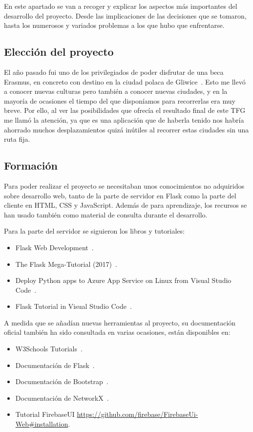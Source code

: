 
En este apartado se van a recoger y explicar los aspectos más importantes del desarrollo del proyecto. Desde las implicaciones de las decisiones que se tomaron, hasta los numerosos y variados problemas a los que hubo que enfrentarse.

\subsection{Elección del proyecto}

El año pasado fui uno de los privilegiados de poder disfrutar de una beca Erasmus, en concreto con destino en la ciudad polaca de Gliwice~\cite{wiki:gliwice}.
Esto me llevó a conocer nuevas culturas pero también a conocer nuevas ciudades, y en la mayoría de ocasiones el tiempo del que disponíamos para recorrerlas era muy breve. Por ello, al ver las posibilidades que ofrecía el resultado final de este TFG me llamó la atención, ya que es una aplicación que de haberla tenido nos habría ahorrado muchos desplazamientos quizá inútiles al recorrer estas ciudades sin una ruta fija.

\subsection{Formación}

Para poder realizar el proyecto se necesitaban unos conocimientos no adquiridos sobre desarrollo web, tanto de la parte de servidor en Flask como la parte del cliente en HTML, CSS y JavaScript. Además de para aprendizaje, los recursos se han usado también como material de consulta durante el desarrollo.

Para la parte del servidor se siguieron los libros y tutoriales:
\begin{itemize}
	\item Flask Web Development~\cite{grinberg2014flask}.
	\item The Flask Mega-Tutorial (2017)~\cite{grinberg-mega}.
	\item Deploy Python apps to Azure App Service on Linux from Visual Studio Code~\cite{deploy-flask-azure}.
	\item Flask Tutorial in Visual Studio Code~\cite{vscode-flask}.
\end{itemize}


A medida que se añadían nuevas herramientas al proyecto, su documentación
oficial también ha sido consultada en varias ocasiones, están disponibles en:
\begin{itemize}
	\item W3Schools Tutorials~\cite{w3schools}.
	\item Documentación de Flask~\cite{doc:flask}.
	\item Documentación de Bootstrap~\cite{doc:bootstrap}.
	\item Documentación de NetworkX~\cite{SciPyProceedings_11}.
	\item Tutorial FirebaseUI \url{https://github.com/firebase/FirebaseUi-Web#installation}.
\end{itemize}

